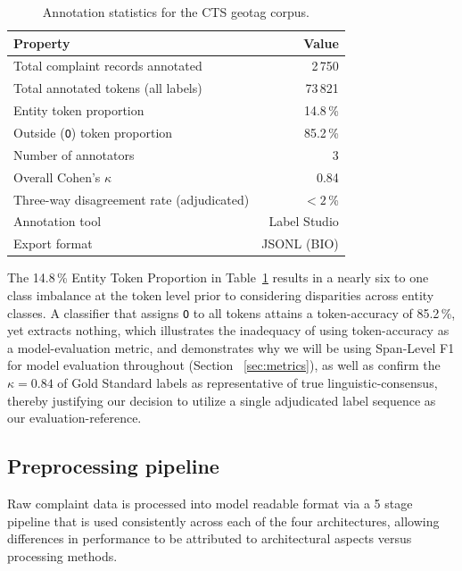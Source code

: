 \begin{table}[H]
\centering
\caption{Annotation statistics for the CTS geotag corpus.}
\label{tab:annotation_stats}
\renewcommand{\arraystretch}{1.3}
\begin{tabular}{lr}
\toprule
\textbf{Property} & \textbf{Value} \\
\midrule
Total complaint records annotated         & 2\,750 \\
Total annotated tokens (all labels)       & 73\,821 \\
Entity token proportion                   & 14.8\,\% \\
Outside (\texttt{O}) token proportion     & 85.2\,\% \\
Number of annotators                      & 3 \\
Overall Cohen's $\kappa$                  & 0.84 \\
Three-way disagreement rate (adjudicated) & $<2$\,\% \\
Annotation tool                           & Label Studio \\
Export format                             & JSONL (BIO) \\
\bottomrule
\end{tabular}
\end{table}

The 14.8\,\% Entity Token Proportion in Table~\ref{tab:annotation_stats} results in a nearly six to one class imbalance at the token level prior to considering disparities across entity classes. A classifier that assigns \texttt{O} to all tokens attains a token-accuracy of 85.2\,\%, yet extracts nothing, which illustrates the inadequacy of using token-accuracy as a model-evaluation metric, and demonstrates why we will be using Span-Level F1 for model evaluation throughout (Section ~\ref{sec:metrics}), as well as confirm the $\kappa = 0.84$ of Gold Standard labels as representative of true linguistic-consensus, thereby justifying our decision to utilize a single adjudicated label sequence as our evaluation-reference.

\subsection{Preprocessing pipeline}
\label{sec:preprocessing}

Raw complaint data is processed into model readable format via a 5 stage pipeline that is used consistently across each of the four architectures, allowing differences in performance to be attributed to architectural aspects versus processing methods. 

